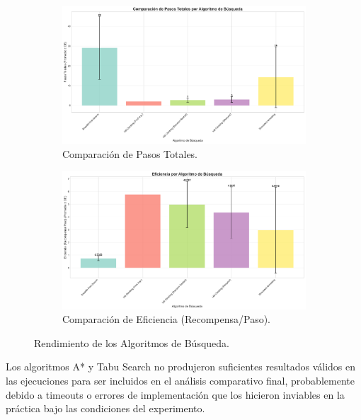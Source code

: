 \documentclass[12pt, oneside, openany]{book}
\begin{document}
\begin{figure}[H]
    \centering
    \begin{subfigure}[b]{0.49\textwidth}
        \includegraphics[width=\textwidth]{informe_visuals/search_pasos_comparacion.png}
        \caption{Comparación de Pasos Totales.}
        \label{fig:search_pasos}
    \end{subfigure}
    \hfill
    \begin{subfigure}[b]{0.49\textwidth}
        \includegraphics[width=\textwidth]{informe_visuals/search_eficiencia_comparacion.png}
        \caption{Comparación de Eficiencia (Recompensa/Paso).}
        \label{fig:search_eficiencia}
    \end{subfigure}
    \caption{Rendimiento de los Algoritmos de Búsqueda.}
    \label{fig:search_graphs}
\end{figure}

Los algoritmos A* y Tabu Search no produjeron suficientes resultados válidos en las ejecuciones para ser incluidos en el análisis comparativo final, probablemente debido a timeouts o errores de implementación que los hicieron inviables en la práctica bajo las condiciones del experimento.
\end{document}
